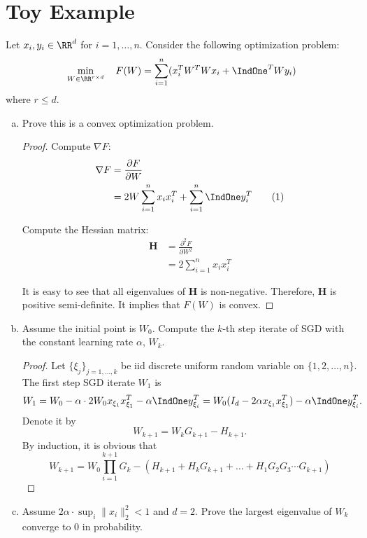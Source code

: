 \section*{Toy Example}
Let $x_i, y_i \in \RR^d$ for $i = 1, \dots, n$. Consider the following optimization problem:
\begin{align*}
	\min_{W \in \RR^{r\times d}} \quad F(W) = \sum_{i=1}^n (x_i^T W^T W x_i + \IndOne^T W y_i)
\end{align*}  
where $r \leq d$.
\begin{enumerate}[a)]
	\item Prove this is a convex optimization problem.
	\begin{proof}
		Compute $\nabla F$:
		\begin{align*}
			\nabla F &= \frac{\partial F}{\partial W} \\
			&= 2 W \sum_{i=1}^n x_i x_i^T + \sum_{i=1}^n \IndOne y_i^T  \tag{1}
		\end{align*}
		
		Compute the Hessian matrix:
		\begin{align*}
			\mathbf{H} &= \frac{\partial^2 F}{\partial W^2} \\
			&=  2 \sum_{i=1}^n x_i x_i^T
		\end{align*}
		
		It is easy to see that all eigenvalues of $\mathbf{H}$ is non-negative. Therefore, $\mathbf{H}$ is positive semi-definite. It implies that $F(W)$ is convex. 
	\end{proof}

	\item Assume the initial point is $W_0$. Compute the $k$-th step iterate of SGD with the constant learning rate $\alpha$, $W_k$.
	\begin{proof}
		Let $\{\xi_j\}_{j=1,\dots, k}$ be iid discrete uniform random variable on $\{1, 2, \dots, n\}$. The first step SGD iterate $W_1$ is 
		$$W_1 = W_0 - \alpha \cdot 2W_0 x_{\xi_1} x_{\xi_1}^T - \alpha  \IndOne y_{\xi_i}^T= W_0 ( I_d - 2\alpha x_{\xi_1} x_{\xi_1}^T ) - \alpha \IndOne y_{\xi_i}^T.$$
		Denote it by
		$$W_{k+1} = W_k G_{k+1} - H_{k+1}.$$
		By induction, it is obvious that 
		$$W_{k+1} = W_0 \prod_{i=1}^{k+1}G_{k} - \left( H_{k+1} + H_kG_{k+1} + \dots + H_1G_2 G_3 \cdots G_{k+1}  \right) $$
	\end{proof}

	\item Assume $2 \alpha \cdot{\sup_i \|x_i \|_2^2 } < 1$ and $d=2$. Prove the largest eigenvalue of $W_k$ converge to $0$ in probability.
	

\end{enumerate}
